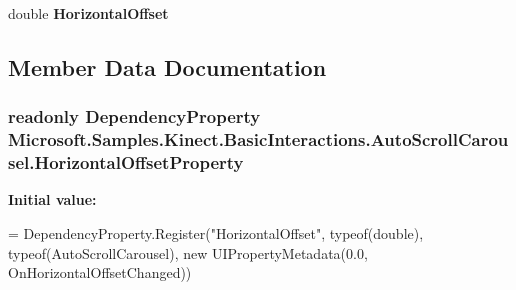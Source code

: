 \begin{DoxyCompactItemize}
\item 
\hypertarget{class_microsoft_1_1_samples_1_1_kinect_1_1_basic_interactions_1_1_auto_scroll_carousel_a34a96f906e5d41442f5079f5591a8ed9}{double {\bfseries Horizontal\-Offset}}\label{class_microsoft_1_1_samples_1_1_kinect_1_1_basic_interactions_1_1_auto_scroll_carousel_a34a96f906e5d41442f5079f5591a8ed9}

\end{DoxyCompactItemize}


\subsection{Member Data Documentation}
\hypertarget{class_microsoft_1_1_samples_1_1_kinect_1_1_basic_interactions_1_1_auto_scroll_carousel_a1a6f1fdfeed4275c698ea654723a102b}{
\subsubsection[{Horizontal\-Offset\-Property}]{\setlength{\rightskip}{0pt plus 5cm}readonly Dependency\-Property Microsoft.\-Samples.\-Kinect.\-Basic\-Interactions.\-Auto\-Scroll\-Carousel.\-Horizontal\-Offset\-Property\hspace{0.3cm}{\ttfamily [static]}}}\label{class_microsoft_1_1_samples_1_1_kinect_1_1_basic_interactions_1_1_auto_scroll_carousel_a1a6f1fdfeed4275c698ea654723a102b}
{\bfseries Initial value\-:}
\begin{DoxyCode}
=
            DependencyProperty.Register(\textcolor{stringliteral}{"HorizontalOffset"}, typeof(\textcolor{keywordtype}{double}), typeof(AutoScrollCarousel), \textcolor{keyword}{new}
       UIPropertyMetadata(0.0, OnHorizontalOffsetChanged))
\end{DoxyCode}
